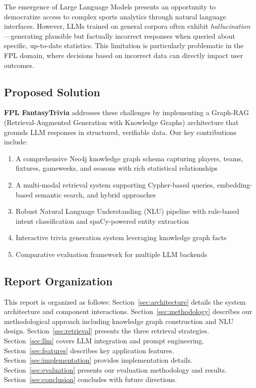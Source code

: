 \documentclass[11pt, a4paper]{article}
\begin{document}
The emergence of Large Language Models presents an opportunity to democratize access to complex sports analytics through natural language interfaces. However, LLMs trained on general corpora often exhibit \textit{hallucination}---generating plausible but factually incorrect responses when queried about specific, up-to-date statistics. This limitation is particularly problematic in the FPL domain, where decisions based on incorrect data can directly impact user outcomes.

\subsection{Proposed Solution}
\textbf{FPL FantasyTrivia} addresses these challenges by implementing a Graph-RAG (Retrieval-Augmented Generation with Knowledge Graphs) architecture that grounds LLM responses in structured, verifiable data. Our key contributions include:

\begin{enumerate}
    \item A comprehensive Neo4j knowledge graph schema capturing players, teams, fixtures, gameweeks, and seasons with rich statistical relationships
    \item A multi-modal retrieval system supporting Cypher-based queries, embedding-based semantic search, and hybrid approaches
    \item Robust Natural Language Understanding (NLU) pipeline with rule-based intent classification and spaCy-powered entity extraction
    \item Interactive trivia generation system leveraging knowledge graph facts
    \item Comparative evaluation framework for multiple LLM backends
\end{enumerate}

\subsection{Report Organization}
This report is organized as follows: Section~\ref{sec:architecture} details the system architecture and component interactions. Section~\ref{sec:methodology} describes our methodological approach including knowledge graph construction and NLU design. Section~\ref{sec:retrieval} presents the three retrieval strategies. Section~\ref{sec:llm} covers LLM integration and prompt engineering. Section~\ref{sec:features} describes key application features. Section~\ref{sec:implementation} provides implementation details. Section~\ref{sec:evaluation} presents our evaluation methodology and results. Section~\ref{sec:conclusion} concludes with future directions.
\end{document}

